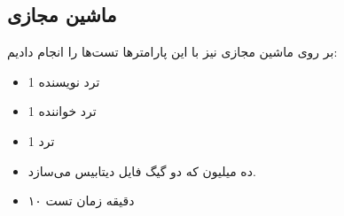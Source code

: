 \subsection{ماشین مجازی}
بر روی ماشین مجازی نیز با این پارامتر‌ها تست‌ها را انجام دادیم:
\begin{itemize}
    \item 1 ترد نویسنده
    \item 1 ترد خواننده
    \item 1 ترد 
    \item ده میلیون  که دو گیگ فایل دیتابیس می‌سازد.
    \item ۱۰ دقیقه زمان تست
\end{itemize}